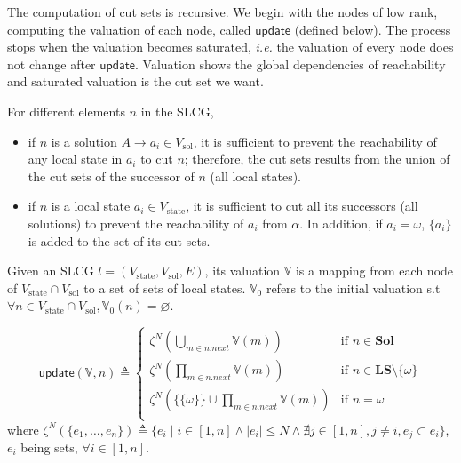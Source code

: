 The computation of cut sets is recursive.
We begin with the nodes of low rank, computing the valuation of each node, called $\mathsf{update}$ (defined below).
The process stops when the valuation becomes saturated, \textit{i.e.} the valuation of every node does not change after $\mathsf{update}$.
Valuation shows the global dependencies of reachability and saturated valuation is the cut set we want.

For different elements $n$ in the SLCG,  

\begin{itemize}
\item if $n$ is a solution $A\to a_i \in V_{\mathrm{sol}}$, it is sufficient to prevent the reachability of any local state in $a_i$ to cut $n$; therefore, the cut sets results from the union
of the cut sets of the successor of $n$ (all local states).
\item if $n$ is a local state $a_i\in V_{\mathrm{state}}$, it is sufficient to cut all its successors (all solutions) to prevent the reachability of $a_i$ from $\alpha$. 
In addition, if $a_i=\omega$, $\{a_i\}$ is added to the set of its cut sets.
\end{itemize}

\begin{definition}[Valuation]\label{def:valuation}
Given an SLCG $l= (V_{\mathrm{state}},V_{\mathrm{sol}},E)$, its valuation $\mathbb{V}$ is a mapping from each node of $V_{\mathrm{state}}\cap V_{\mathrm{sol}}$ to a set of sets of local states.
$\mathbb{V}_0$ refers to the initial valuation s.t $\forall n \in V_{\mathrm{state}}\cap V_{\mathrm{sol}}, \mathbb{V}_0(n)=\varnothing$.
\end{definition}


\begin{definition}
\begin{equation}  
\mathsf{update}(\mathbb{V},n)\triangleq 
      \begin{cases}
            \zeta^N(\bigcup_{m\in n.next}\mathbb{V}(m))&\text{if } n\in\mathbf{Sol}\\
            \zeta^N(\prod_{m\in n.next}\mathbb{V}(m))&\text{if } n\in\mathbf{LS}\setminus\{\omega\}\\
            \zeta^N(\{\{\omega\}\}\cup\prod_{m\in n.next}\mathbb{V}(m))&\text{if }n=\omega\\
      \end{cases}
\end{equation}
where $\zeta^N(\{e_1,\ldots,e_n\})\triangleq\{e_i\mid i\in[1,n]\land |e_i|\leq N\land\nexists j\in[1,n],j\neq i,e_j\subset e_i\}$, $e_i$ being sets, $\forall i\in[1,n]$.
\end{definition}

